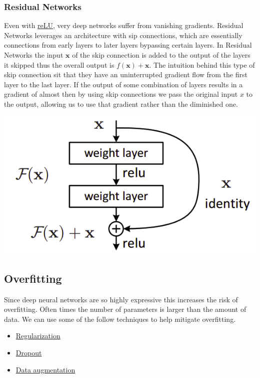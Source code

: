 \documentclass[12pt]{article}
\begin{document}
        \subsubsection{Residual Networks} \label{sec:ResNet}
            Even with \hyperref[sec:reLU]{reLU}, very deep networks suffer from vanishing gradients. Residual Networks
            leverages an architecture with sip connections, which are essentially connections from early layers to later
            layers bypassing certain layers. In Residual Networks the input $\boldsymbol{x}$ of the skip connection is added to the
            output of the layers it skipped thus the overall output is $f(\boldsymbol{x}) + \boldsymbol{x}$. The
            intuition behind this type of skip connection sit that they have an uninterrupted gradient flow from the
            first layer to the last layer. If the output of some combination of layers results in a gradient of almost
            then by using skip connections we pass the original input $x$ to the output, allowing us to use that
            gradient rather than the diminished one.

            \begin{center}
                \includegraphics[scale=0.5]{ResNet.png}
            \end{center}

    \subsection{Overfitting}
        Since deep neural networks are so highly expressive this increases the risk of overfitting. Often times the
        number of parameters is larger than the amount of data. We can use some of the follow techniques to help
        mitigate overfitting.
    
        \begin{itemize}
            \item \hyperref[sec:Regularization]{Regularization}
            \item \hyperref[sec:Dropout]{Dropout}
            \item \hyperref[sec:DataAugmentation]{Data augmentation}
        \end{itemize}
\end{document}
